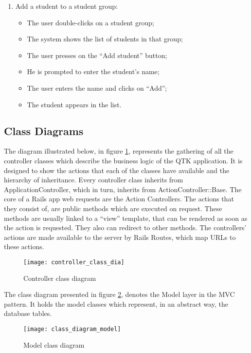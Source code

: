 \begin{enumerate}
  \item Add a student to a student group:
  \begin{itemize}
    \item The user double-clicks on a student group;
    \item The system shows the list of students in that group;
    \item The user presses on the “Add student” button;
    \item He is prompted to enter the student’s name;
    \item The user enters the name and clicks on “Add”;
    \item The student appears in the list.
  \end{itemize}
\end{enumerate}

\subsection{Class Diagrams}

The diagram illustrated below, in figure \ref{controller_class}, represents the gathering of all the controller classes which describe the business logic of the QTK application. It is designed to show the actions that each of the classes have available and the hierarchy of inheritance. Every controller class inherits from ApplicationController, which in turn, inherits from ActionController::Base. The core of a Rails app web requests are the Action Controllers. The actions that they consist of, are public methods which are executed on request. These methods are usually linked to a ``view'' template, that can be rendered as soon as the action is requested. They also can redirect to other methods. The controllers' actions are made available to the server by Rails Routes, which map URLs to these actions. 

\begin{figure}[!ht]
\centering
\texttt{[image: controller\_class\_dia]}
\caption{Controller class diagram}\label{controller_class}
\end{figure}

The class diagram presented in figure \ref{model_class}, denotes the Model layer in the MVC pattern. It holds the model classes which represent, in an abstract way, the database tables. 

\begin{figure}[!ht]
\centering
\texttt{[image: class\_diagram\_model]}
\caption{Model class diagram}\label{model_class}
\end{figure}

